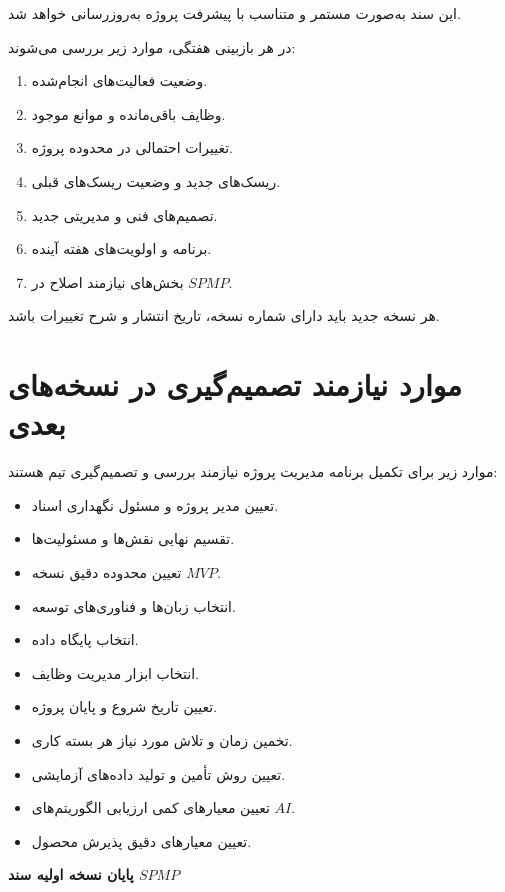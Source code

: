 \documentclass[12pt,a4paper]{article}
\begin{document}
	این سند به‌صورت مستمر و متناسب با پیشرفت
	پروژه به‌روزرسانی خواهد شد.
	
	در هر بازبینی هفتگی، موارد زیر بررسی می‌شوند:
	
	\begin{enumerate}
		\item وضعیت فعالیت‌های انجام‌شده.
		\item وظایف باقی‌مانده و موانع موجود.
		\item تغییرات احتمالی در محدوده پروژه.
		\item ریسک‌های جدید و وضعیت ریسک‌های قبلی.
		\item تصمیم‌های فنی و مدیریتی جدید.
		\item برنامه و اولویت‌های هفته آینده.
		\item بخش‌های نیازمند اصلاح در $SPMP$.
	\end{enumerate}
	
	هر نسخه جدید باید دارای شماره نسخه،
	تاریخ انتشار و شرح تغییرات باشد.
	
	
	\appendix
	
	\section{موارد نیازمند تصمیم‌گیری در نسخه‌های بعدی}
	
	موارد زیر برای تکمیل برنامه مدیریت پروژه
	نیازمند بررسی و تصمیم‌گیری تیم هستند:
	
	\begin{itemize}
		\item تعیین مدیر پروژه و مسئول نگهداری اسناد.
		\item تقسیم نهایی نقش‌ها و مسئولیت‌ها.
		\item تعیین محدوده دقیق نسخه $MVP$.
		\item انتخاب زبان‌ها و فناوری‌های توسعه.
		\item انتخاب پایگاه داده.
		\item انتخاب ابزار مدیریت وظایف.
		\item تعیین تاریخ شروع و پایان پروژه.
		\item تخمین زمان و تلاش مورد نیاز هر بسته کاری.
		\item تعیین روش تأمین و تولید داده‌های آزمایشی.
		\item تعیین معیارهای کمی ارزیابی الگوریتم‌های $AI$.
		\item تعیین معیارهای دقیق پذیرش محصول.
	\end{itemize}
	
	\vspace{1cm}
	
	\begin{center}
		\textbf{پایان نسخه اولیه سند $SPMP$}
	\end{center}
	
\end{document}
